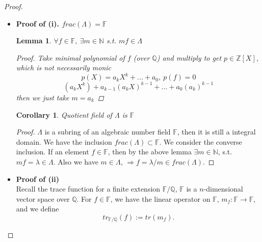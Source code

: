 \documentclass[11pt]{article}
\newtheorem{lemma}[thm]{Lemma}
\newtheorem{cor}[thm]{Corollary}
\newcommand{\intg}{\mathbb Z}
\newcommand{\bbf}{\mathbb F}
\newcommand{\ratl}{\mathbb Q}
\newcommand{\lrta}{\longrightarrow}
\newcommand{\Lrta}{\Longrightarrow}
\newcommand{\Llta}{\Longleftarrow}
\newcommand{\lgl}{\langle}
\newcommand{\rgl}{\rangle}
\begin{document}
\begin{proof}
\begin{itemize}
\begin{proof}
	``$\Llta$'' Given $L=\lgl b_1,...,b_k\rgl$, s.t. $fL\subset L$, then we can set
	$$
	f b_i=\sum_{j}a_{ij}b_j
	$$
	for some matrix $(a_{ij})$ of rational integers. Writing this as
	$$
	\sum_{j}(f\delta_{ij}-a_{ij})b_j=0, 
	$$
	It follows that $f$ satisfies
	$$
	det
	\begin{pmatrix}
	f-a_{11} & a_{12} & \dots  & a_{1k}\\
	a_{21} & f-a_{22} & \dots  & a_{2k}\\
	\vdots  & \vdots  & \ddots  & \vdots \\
	a_{k1} & a_{k2} & \dots  & f-a_{kk}
	\end{pmatrix}=0
	$$
	it is a monic polynomial with coefficients in $\intg$. Then we conclude the $f$ is an algebraic integer.
	\end{proof}
	Then, we conclude that set set of algebraic integer $\Lambda$ is closed under addition and multiplication,\textbf{(It is a ring)}. For if $\lambda,\lambda'\in \Lambda$, then there exists lattice $L$ and $L'$ s.t. $\lambda L\subset L$ and $\lambda'L'\subset L'$ respectively. Now the product lattice $L''=L L'$ will satisfy $(\lambda+\lambda')L''\subset L''$ and $\lambda\lambda'L''\subset L''$.
	\item \textbf{Proof of (i). $frac(\Lambda)=\bbf$}\\
	\begin{lemma}\label{lem:multiply_by_m}
	$\forall f\in \bbf,\ \exists m\in \mathbb{N}$ s.t. $m f\in \Lambda$
	\begin{proof}
	Take minimal polynomial of $f$ (over $\ratl$) and multiply to get $p\in \intg[X]$, which is not necessarily monic
	$$
	p(X)=a_k X^k+...+a_0,\  p(f)=0
	$$
	$$
	(a_k X^k)+a_{k-1}(a_k X)^{k-1}+...+a_0 (a_k)^{k-1}
	$$
	then we just take $m=a_k$
	\end{proof}
	\end{lemma}

	\begin{cor}
	Quotient field of $\Lambda$ is $\bbf$
	\end{cor}
	\begin{proof}
		$\Lambda$ is a subring of an algebraic number field $\bbf$, then it is still a integral domain. We have the inclusion $frac(\Lambda)\subset \bbf$. We consider the converse inclusion. If an element $f\in \bbf$, then by the above lemma $\exists m\in \mathbb{N}$, s.t. $mf=\lambda\in \Lambda$. Also we have $m\in \Lambda$, $\Lrta f=\lambda/m\in frac(\Lambda)$.
	\end{proof}
\item \textbf{Proof of (ii)}\\
	Recall the trace function for a finite extension $\bbf/\ratl$, $\bbf$ is a  $n$-dimensional vector space over $\ratl$.  For $f\in \bbf$, we have the linear operator on $\bbf$, $m_f:\bbf\lrta \bbf$, and we define
	$$
	tr_{\bbf/\ratl}(f):=tr(m_f).
	$$


\end{itemize}
\end{proof}
\end{document}
